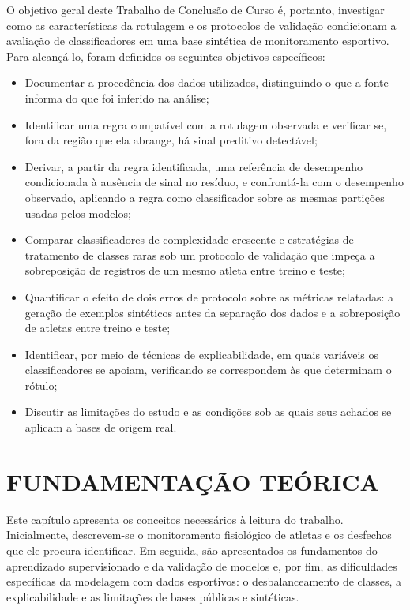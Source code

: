 O objetivo geral deste Trabalho de Conclusão de Curso é, portanto, investigar como as características da rotulagem e os protocolos de validação condicionam a avaliação de classificadores em uma base sintética de monitoramento esportivo. Para alcançá-lo, foram definidos os seguintes objetivos específicos:
\begin{itemize}
    \item Documentar a procedência dos dados utilizados, distinguindo o que a fonte informa do que foi inferido na análise;
    \item Identificar uma regra compatível com a rotulagem observada e verificar se, fora da região que ela abrange, há sinal preditivo detectável;
    \item Derivar, a partir da regra identificada, uma referência de desempenho condicionada à ausência de sinal no resíduo, e confrontá-la com o desempenho observado, aplicando a regra como classificador sobre as mesmas partições usadas pelos modelos;
    \item Comparar classificadores de complexidade crescente e estratégias de tratamento de classes raras sob um protocolo de validação que impeça a sobreposição de registros de um mesmo atleta entre treino e teste;
    \item Quantificar o efeito de dois erros de protocolo sobre as métricas relatadas: a geração de exemplos sintéticos antes da separação dos dados e a sobreposição de atletas entre treino e teste;
    \item Identificar, por meio de técnicas de explicabilidade, em quais variáveis os classificadores se apoiam, verificando se correspondem às que determinam o rótulo;
    \item Discutir as limitações do estudo e as condições sob as quais seus achados se aplicam a bases de origem real.
\end{itemize}

\chapter{FUNDAMENTAÇÃO TEÓRICA}

Este capítulo apresenta os conceitos necessários à leitura do trabalho. Inicialmente, descrevem-se o monitoramento fisiológico de atletas e os desfechos que ele procura identificar. Em seguida, são apresentados os fundamentos do aprendizado supervisionado e da validação de modelos e, por fim, as dificuldades específicas da modelagem com dados esportivos: o desbalanceamento de classes, a explicabilidade e as limitações de bases públicas e sintéticas.

